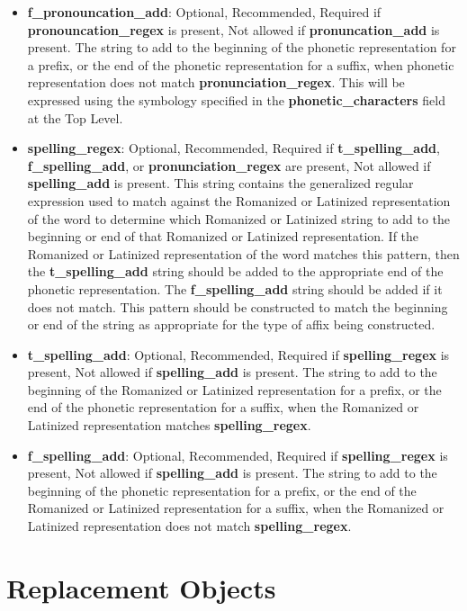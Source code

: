 \begin{itemize}
	\item \textbf{f\_pronouncation\_add}: Optional, Recommended, Required if \textbf{pronouncation\_regex} is present, Not allowed if \textbf{pronuncation\_add} is present.  The string to add to the beginning of the phonetic representation for a prefix, or the end of the phonetic representation for a suffix, when phonetic representation does not match \textbf{pronunciation\_regex}.  This will be expressed using the symbology specified in the \textbf{phonetic\_characters} field at the Top Level.
	\item \textbf{spelling\_regex}: Optional, Recommended, Required if \textbf{t\_spelling\_add}, \textbf{f\_spelling\_add}, or \textbf{pronunciation\_regex} are present, Not allowed if \textbf{spelling\_add} is present.  This string contains the generalized regular expression used to match against the Romanized or Latinized representation of the word to determine which Romanized or Latinized string to add to the beginning or end of that Romanized or Latinized representation.  If the Romanized or Latinized representation of the word matches this pattern, then the \textbf{t\_spelling\_add} string should be added to the appropriate end of the phonetic representation.  The \textbf{f\_spelling\_add} string should be added if it does not match.  This pattern should be constructed to match the beginning or end of the string as appropriate for the type of affix being constructed.
	\item \textbf{t\_spelling\_add}: Optional, Recommended, Required if \textbf{spelling\_regex} is present, Not allowed if \textbf{spelling\_add} is present.  The string to add to the beginning of the Romanized or Latinized representation for a prefix, or the end of the phonetic representation for a suffix, when the Romanized or Latinized representation matches \textbf{spelling\_regex}.
	\item \textbf{f\_spelling\_add}: Optional, Recommended, Required if \textbf{spelling\_regex} is present, Not allowed if \textbf{spelling\_add} is present.  The string to add to the beginning of the phonetic representation for a prefix, or the end of the Romanized or Latinized representation for a suffix, when the Romanized or Latinized representation does not match \textbf{spelling\_regex}.
\end{itemize}

\section{Replacement Objects}

